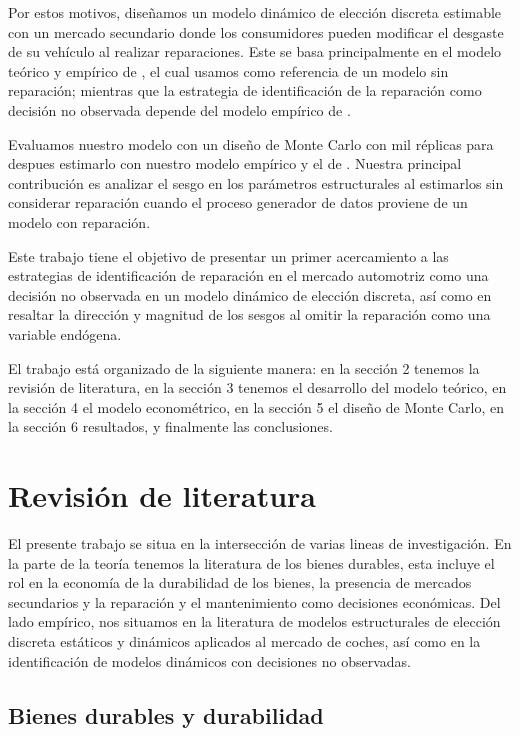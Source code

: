 \documentclass{article}
\begin{document}
Por estos motivos, diseñamos un modelo dinámico de elección discreta estimable con un mercado secundario donde los consumidores pueden modificar el desgaste de su vehículo al realizar reparaciones. Este se basa principalmente en el modelo teórico y empírico de \textcite{Gillingham2022}, el cual usamos como referencia de un modelo sin reparación; mientras que la estrategia de identificación de la reparación como decisión no observada depende del modelo empírico de \textcite{HuXin2024}.

Evaluamos nuestro modelo con un diseño de Monte Carlo con mil réplicas para despues estimarlo con nuestro modelo empírico y el de \textcite{Gillingham2022}. Nuestra principal contribución es analizar el sesgo en los parámetros estructurales al estimarlos sin considerar reparación cuando el proceso generador de datos proviene de un modelo con reparación. 

Este trabajo tiene el objetivo de presentar un primer acercamiento a las estrategias de identificación de reparación en el mercado automotriz como una decisión no observada en un modelo dinámico de elección discreta, así como en resaltar la dirección y magnitud de los sesgos al omitir la reparación como una variable endógena.

El trabajo está organizado de la siguiente manera: en la sección 2 tenemos la revisión de literatura, en la sección 3 tenemos el desarrollo del modelo teórico, en la sección 4 el modelo econométrico, en la sección 5 el diseño de Monte Carlo, en la sección 6 resultados, y finalmente las conclusiones.



\section{Revisión de literatura}




El presente trabajo se situa en la intersección de varias lineas de investigación. En la parte de la teoría tenemos la literatura de los bienes durables, esta incluye el rol en la economía de la durabilidad de los bienes, la presencia de mercados secundarios y la reparación y el mantenimiento como decisiones económicas. Del lado empírico, nos situamos en la literatura de modelos estructurales de elección discreta estáticos y dinámicos aplicados al mercado de coches, así como en la identificación de modelos dinámicos con decisiones no observadas.

\subsection{Bienes durables y durabilidad}
\end{document}
